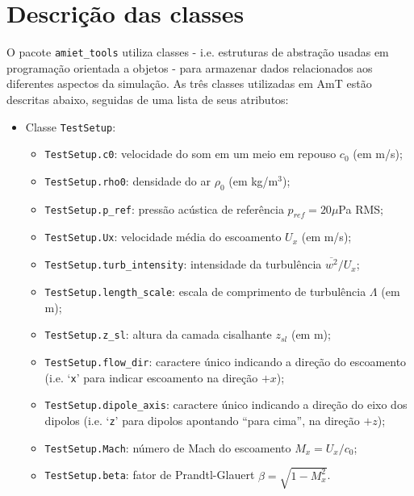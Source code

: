\documentclass[a4paper, 11pt, twoside]{article}
\begin{document}
\clearpage
\newpage

\section{Descrição das classes}
\label{sec:ClassDescription}

O pacote \verb|amiet_tools| utiliza classes - i.e. estruturas de abstração usadas em programação orientada a objetos - para armazenar dados relacionados aos diferentes aspectos da simulação. As três classes utilizadas em AmT estão descritas abaixo, seguidas de uma lista de seus atributos:

\begin{itemize}
	\item Classe \verb|TestSetup|:
	\begin{itemize}
		\item \verb|TestSetup.c0|: velocidade do som em um meio em repouso $c_0$ (em m/s);
		\item \verb|TestSetup.rho0|: densidade do ar $\rho_0$ (em kg/m$^3$);
		\item \verb|TestSetup.p_ref|: pressão acústica de referência $p_{ref} = 20 \mu$Pa RMS;
		\item \verb|TestSetup.Ux|: velocidade média do escoamento $U_x$ (em m/s);
		\item \verb|TestSetup.turb_intensity|: intensidade da turbulência $\overline{w^2}/U_x$;
		\item \verb|TestSetup.length_scale|: escala de comprimento de turbulência $\Lambda$ (em m);
		\item \verb|TestSetup.z_sl|: altura da camada cisalhante $z_{sl}$ (em m);
		\item \verb|TestSetup.flow_dir|: caractere único indicando a direção do escoamento (i.e. `\verb|x|' para indicar escoamento na direção $+x$);
		\item \verb|TestSetup.dipole_axis|: caractere único indicando a direção do eixo dos dipolos (i.e. `\verb|z|' para dipolos apontando ``para cima'', na direção $+z$);
		\item \verb|TestSetup.Mach|: número de Mach do escoamento $M_x = U_x/c_0$;
		\item \verb|TestSetup.beta|: fator de Prandtl-Glauert $\beta = \sqrt{1-M_x^2}$.
	\end{itemize}
	

\end{itemize}
\end{document}

